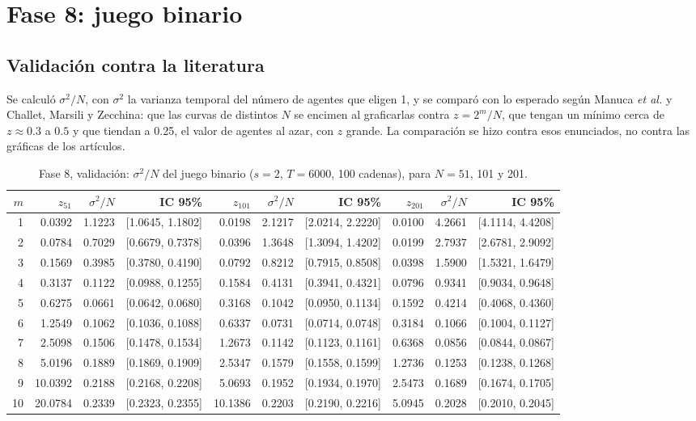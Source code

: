 \documentclass[11pt,letterpaper]{article}
\begin{document}
\section{Fase 8: juego binario}

\subsection{Validación contra la literatura}
Se calculó $\sigma^2/N$, con $\sigma^2$ la varianza temporal del número de agentes que eligen 1, y se comparó con lo esperado según Manuca \emph{et al.} y Challet, Marsili y Zecchina: que las curvas de distintos $N$ se encimen al graficarlas contra $z=2^m/N$, que tengan un mínimo cerca de $z\approx 0.3$ a $0.5$ y que tiendan a 0.25, el valor de agentes al azar, con $z$ grande. La comparación se hizo contra esos enunciados, no contra las gráficas de los artículos.

\begin{table}[H]
\centering
\footnotesize
\setlength{\tabcolsep}{3.5pt}
\caption{Fase 8, validación: $\sigma^2/N$ del juego binario ($s=2$, $T=6000$, 100 cadenas), para $N=51$, 101 y 201.}\label{tab:val}
\begin{tabular}{rrrrrrrrrr}
\toprule
$m$ & $z_{51}$ & $\sigma^2/N$ & IC 95\% & $z_{101}$ & $\sigma^2/N$ & IC 95\% & $z_{201}$ & $\sigma^2/N$ & IC 95\% \\
\midrule
1 & 0.0392 & 1.1223 & [1.0645, 1.1802] & 0.0198 & 2.1217 & [2.0214, 2.2220] & 0.0100 & 4.2661 & [4.1114, 4.4208] \\
2 & 0.0784 & 0.7029 & [0.6679, 0.7378] & 0.0396 & 1.3648 & [1.3094, 1.4202] & 0.0199 & 2.7937 & [2.6781, 2.9092] \\
3 & 0.1569 & 0.3985 & [0.3780, 0.4190] & 0.0792 & 0.8212 & [0.7915, 0.8508] & 0.0398 & 1.5900 & [1.5321, 1.6479] \\
4 & 0.3137 & 0.1122 & [0.0988, 0.1255] & 0.1584 & 0.4131 & [0.3941, 0.4321] & 0.0796 & 0.9341 & [0.9034, 0.9648] \\
5 & 0.6275 & 0.0661 & [0.0642, 0.0680] & 0.3168 & 0.1042 & [0.0950, 0.1134] & 0.1592 & 0.4214 & [0.4068, 0.4360] \\
6 & 1.2549 & 0.1062 & [0.1036, 0.1088] & 0.6337 & 0.0731 & [0.0714, 0.0748] & 0.3184 & 0.1066 & [0.1004, 0.1127] \\
7 & 2.5098 & 0.1506 & [0.1478, 0.1534] & 1.2673 & 0.1142 & [0.1123, 0.1161] & 0.6368 & 0.0856 & [0.0844, 0.0867] \\
8 & 5.0196 & 0.1889 & [0.1869, 0.1909] & 2.5347 & 0.1579 & [0.1558, 0.1599] & 1.2736 & 0.1253 & [0.1238, 0.1268] \\
9 & 10.0392 & 0.2188 & [0.2168, 0.2208] & 5.0693 & 0.1952 & [0.1934, 0.1970] & 2.5473 & 0.1689 & [0.1674, 0.1705] \\
10 & 20.0784 & 0.2339 & [0.2323, 0.2355] & 10.1386 & 0.2203 & [0.2190, 0.2216] & 5.0945 & 0.2028 & [0.2010, 0.2045] \\
\bottomrule
\end{tabular}
\end{table}
\end{document}
